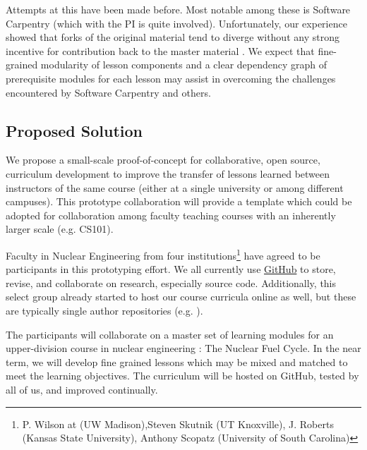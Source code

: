 \documentclass[11pt]{article}
\begin{document}
          Attempts at this have been made before. Most notable among 
          these is Software Carpentry (which with the PI is quite involved). 
          Unfortunately, our experience showed that 
          forks of the original material tend to diverge without any strong 
          incentive for contribution back to the master material 
          \cite{wilson_software_2014,wilson_software_2014-1}. We expect that fine-grained modularity 
          of lesson components and a clear dependency graph of prerequisite 
          modules for each lesson may assist in overcoming the challenges 
          encountered by Software Carpentry and others.

          \subsection*{Proposed Solution}
          We propose a small-scale proof-of-concept for collaborative, open 
          source, curriculum development to improve the transfer of lessons 
          learned between instructors of the same course (either at a single 
          university or among different campuses). This prototype collaboration 
          will provide a template which could be adopted for collaboration 
          among faculty teaching courses with an inherently larger scale (e.g. 
          CS101).

          Faculty in Nuclear Engineering from four institutions\footnote{P.  
          Wilson at (UW Madison),Steven Skutnik (UT Knoxville), J. Roberts 
          (Kansas State University), Anthony Scopatz (University of South 
          Carolina)} have agreed to be participants in 
          this prototyping effort. We all currently use 
          \href{https://github.com}{GitHub} to store, 
          revise, and collaborate on research, especially source code. 
          Additionally, this select group already started to host our course 
          curricula online as well, but these are typically single author 
          repositories (e.g. \cite{huff_npre412_2017}).

          The participants will collaborate on a master set of learning 
          modules for an upper-division course in nuclear engineering : 
          The Nuclear Fuel Cycle. In the near term, we will develop fine 
          grained lessons which may be mixed and matched to meet the 
          learning objectives. The curriculum will be hosted on GitHub, 
          tested by all of us, and improved continually.
\end{document}
